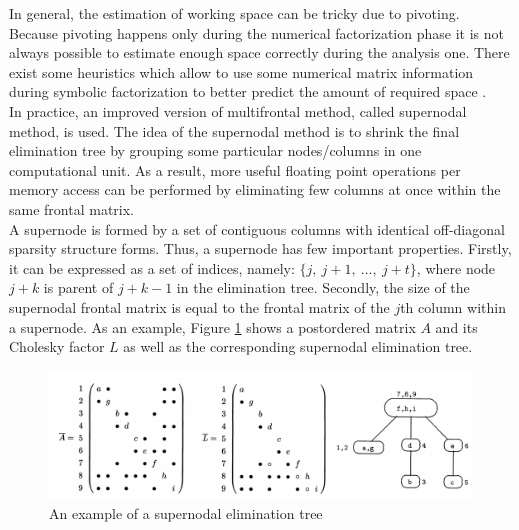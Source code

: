 In general, the estimation of working space can be tricky due to pivoting. Because pivoting happens only during the numerical factorization phase it is not always possible to estimate enough space correctly during the analysis one. There exist some heuristics which allow to use some numerical matrix information during symbolic factorization to better predict the amount of required space \cite{wsmp:direct-solution-of-general-system}.\\


In practice, an improved version of multifrontal method, called supernodal method, is used. The idea of the supernodal method is to shrink the final elimination tree by grouping some particular nodes/columns in one computational unit. As a result, more useful floating point operations per memory access can be performed by eliminating few columns at once within the same frontal matrix.\\

A supernode is formed by a set of contiguous columns with identical off-diagonal sparsity structure forms. Thus, a supernode has few important properties. Firstly, it can be expressed as a set of indices, namely: $\{j, \: j+1, \: \dots, \:j + t\}$, where node $j + k$ is	parent of $j + k - 1$ in the elimination tree. Secondly, the size of the supernodal frontal matrix is equal to the frontal matrix of the $j$th column within a supernode. As an example, Figure \ref{fig:supernodal-method-postordering-and-etree} shows a postordered matrix $A$ and its Cholesky factor $L$ as well as the corresponding supernodal elimination tree.


\figpointer{\ref{fig:supernodal-method-postordering-and-etree}}

\begin{figure}[htpb]
  \centering
  \includegraphics[width=1.0\textwidth]{figures/chapter-2/supernodal-method-postordering-and-etree.png}
\caption{An example of a supernodal elimination tree \cite{mult-frontal-original:2}}
\label{fig:supernodal-method-postordering-and-etree}
\end{figure}
 
